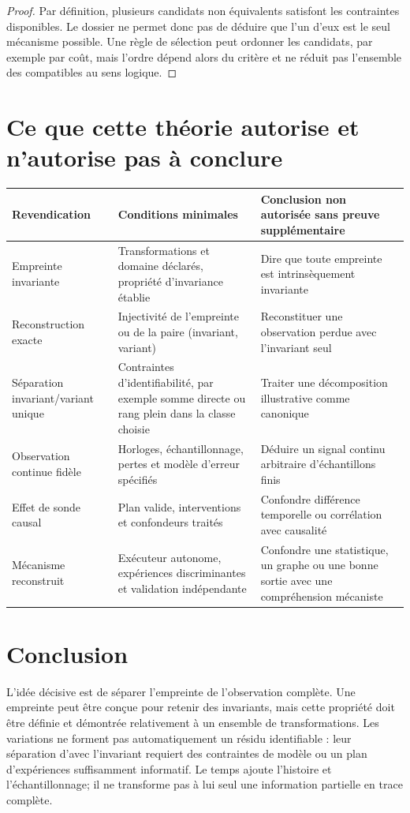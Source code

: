 \documentclass[11pt,oneside]{book}
\theoremstyle{definition}\newtheorem{definition}[theoreme]{Définition}\newtheorem{hypothese}[theoreme]{Hypothèse explicite}\newtheorem{convention}[theoreme]{Convention}\newtheorem{critere}[theoreme]{Critère}
\theoremstyle{remark}\newtheorem{remarque}[theoreme]{Remarque}\newtheorem{contreexemple}[theoreme]{Contre-exemple}
\begin{document}
\begin{proof}
Par définition, plusieurs candidats non équivalents satisfont les contraintes disponibles. Le dossier ne permet donc pas de déduire que l'un d'eux est le seul mécanisme possible. Une règle de sélection peut ordonner les candidats, par exemple par coût, mais l'ordre dépend alors du critère et ne réduit pas l'ensemble des compatibles au sens logique.\end{proof}

\chapter{Ce que cette théorie autorise et n'autorise pas à conclure}
\begin{longtable}{p{}p{}p{}}
\toprule Revendication & Conditions minimales & Conclusion non autorisée sans preuve supplémentaire \\\midrule
\endhead
Empreinte invariante & Transformations et domaine déclarés, propriété d'invariance établie & Dire que toute empreinte est intrinsèquement invariante \\
Reconstruction exacte & Injectivité de l'empreinte ou de la paire (invariant, variant) & Reconstituer une observation perdue avec l'invariant seul \\
Séparation invariant/variant unique & Contraintes d'identifiabilité, par exemple somme directe ou rang plein dans la classe choisie & Traiter une décomposition illustrative comme canonique \\
Observation continue fidèle & Horloges, échantillonnage, pertes et modèle d'erreur spécifiés & Déduire un signal continu arbitraire d'échantillons finis \\
Effet de sonde causal & Plan valide, interventions et confondeurs traités & Confondre différence temporelle ou corrélation avec causalité \\
Mécanisme reconstruit & Exécuteur autonome, expériences discriminantes et validation indépendante & Confondre une statistique, un graphe ou une bonne sortie avec une compréhension mécaniste \\
\bottomrule
\end{longtable}

\chapter{Conclusion}
L'idée décisive est de séparer l'empreinte de l'observation complète. Une empreinte peut être conçue pour retenir des invariants, mais cette propriété doit être définie et démontrée relativement à un ensemble de transformations. Les variations ne forment pas automatiquement un résidu identifiable : leur séparation d'avec l'invariant requiert des contraintes de modèle ou un plan d'expériences suffisamment informatif. Le temps ajoute l'histoire et l'échantillonnage; il ne transforme pas à lui seul une information partielle en trace complète.
\end{document}
